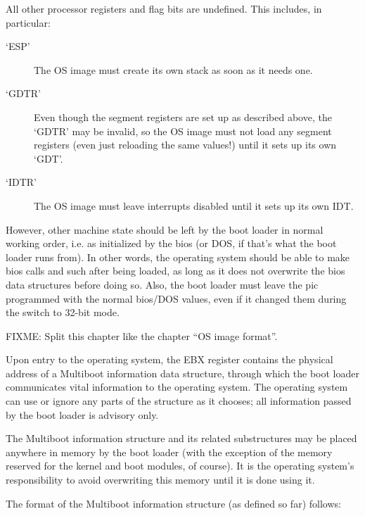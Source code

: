 All other processor registers and flag bits are undefined. This includes, in
particular:

\begin{description}
\item[‘ESP’]
The OS image must create its own stack as soon as it needs one. 
\item[‘GDTR’]
Even though the segment registers are set up as described above, the ‘GDTR’ may
be invalid, so the OS image must not load any segment registers (even just
reloading the same values!) until it sets up its own ‘GDT’.
\item[‘IDTR’]
The OS image must leave interrupts disabled until it sets up its own IDT.
\end{description}

However, other machine state should be left by the boot loader in normal working
order, i.e. as initialized by the bios (or DOS, if that's what the boot loader
runs from). In other words, the operating system should be able to make bios
calls and such after being loaded, as long as it does not overwrite the bios
data structures before doing so. Also, the boot loader must leave the pic
programmed with the normal bios/DOS values, even if it changed them during the
switch to 32-bit mode.


FIXME: Split this chapter like the chapter “OS image format”.

Upon entry to the operating system, the EBX register contains the physical
address of a Multiboot information data structure, through which the boot loader
communicates vital information to the operating system. The operating system can
use or ignore any parts of the structure as it chooses; all information passed
by the boot loader is advisory only.

The Multiboot information structure and its related substructures may be placed
anywhere in memory by the boot loader (with the exception of the memory reserved
for the kernel and boot modules, of course). It is the operating system's
responsibility to avoid overwriting this memory until it is done using it.

The format of the Multiboot information structure (as defined so far) follows:

